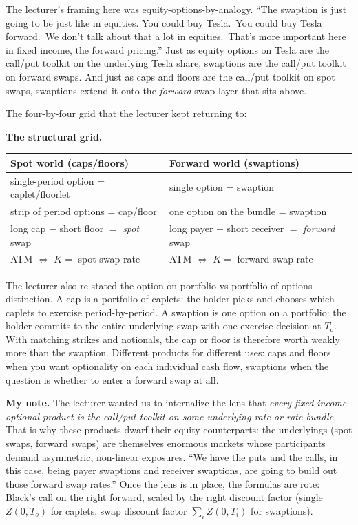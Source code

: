 The lecturer's framing here was equity-options-by-analogy. ``The
swaption is just going to be just like in equities. You could buy
Tesla.\ You could buy Tesla forward.\ We don't talk about that a lot
in equities.\ That's more important here in fixed income, the forward
pricing.'' Just as equity options on Tesla are the call/put toolkit on
the underlying Tesla share, swaptions are the call/put toolkit on
forward swaps. And just as caps and floors are the call/put toolkit on
spot swaps, swaptions extend it onto the \emph{forward}-swap layer
that sits above.

The four-by-four grid that the lecturer kept returning to:

\begin{keyblock}
\textbf{The structural grid.}
\begin{center}
\begin{tabular}{l|l}
\textbf{Spot world (caps/floors)} & \textbf{Forward world (swaptions)} \\
\hline
single-period option = caplet/floorlet & single option = swaption \\
strip of period options = cap/floor & one option on the bundle = swaption \\
long cap $-$ short floor $=$ \emph{spot} swap & long payer $-$ short receiver $=$ \emph{forward} swap \\
ATM $\Leftrightarrow$ $K = $ spot swap rate & ATM $\Leftrightarrow$ $K = $ forward swap rate \\
\end{tabular}
\end{center}
\end{keyblock}

The lecturer also re-stated the option-on-portfolio-vs-portfolio-of-options
distinction. A cap is a portfolio of caplets: the holder picks and
chooses which caplets to exercise period-by-period. A swaption is one
option on a portfolio: the holder commits to the entire underlying
swap with one exercise decision at $T_o$. With matching strikes and
notionals, the cap or floor is therefore worth weakly more than the
swaption. Different products for different uses: caps and floors when
you want optionality on each individual cash flow, swaptions when the
question is whether to enter a forward swap at all.

\begin{checkpoint}
\textbf{My note.} The lecturer wanted us to internalize the lens that
\emph{every fixed-income optional product is the call/put toolkit on
some underlying rate or rate-bundle}. That is why these products dwarf
their equity counterparts: the underlyings (spot swaps, forward swaps)
are themselves enormous markets whose participants demand asymmetric,
non-linear exposures. ``We have the puts and the calls, in this case,
being payer swaptions and receiver swaptions, are going to build out
those forward swap rates.'' Once the lens is in place, the formulas
are rote: Black's call on the right forward, scaled by the right
discount factor (single $Z(0,T_o)$ for caplets, swap discount factor
$\sum_i Z(0,T_i)$ for swaptions).
\end{checkpoint}

